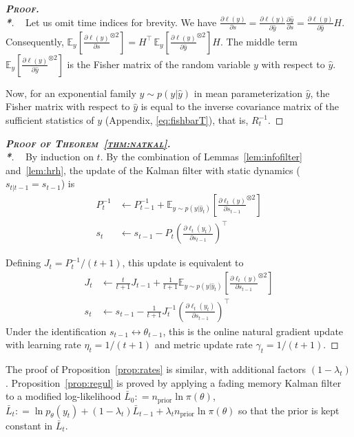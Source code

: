 \documentclass[11pt,a4paper]{article}
\newcommand{\thmheadercommand}[1]{\textbf{\scshape{}#1.\\*}}
\newcommand{\deq}{\mathrel{\mathop{:}}=}
\def\ds{\displaystyle}
\newcommand{\E}{\mathbb{E}}
\newcommand{\1}{\mathbbm{1}}
\newenvironment{dem}[1][]{\begin{proof}[\thmheadercommand{Proof#1}]~\newline\ignorespaces}{\end{proof}}
\theoremstyle{yannthm}
\theoremstyle{yannthm2}
\newcommand{\transp}[1]{#1^{\!\top}\!}
\numberwithin{equation}{section}
\begin{document}
\begin{dem}
Let us omit time indices for brevity. We have $\ds\frac{\partial
\ell(y)}{\partial s}=\frac{\partial \ell(y)}{\partial \hat y}\frac{\partial
\hat y}{\partial s}=\frac{\partial \ell(y)}{\partial \hat y}H$.
Consequently, $\ds \E_y
\left[\frac{\partial \ell(y)}{\partial s}^{\otimes 2}\right]=\transp{H}\,
\E_y
\left[\frac{\partial \ell(y)}{\partial \hat y}^{\otimes 2}\right] H$. 
The middle term $\ds \E_y
\left[\frac{\partial \ell(y)}{\partial \hat y}^{\otimes 2}\right]$ is the
Fisher matrix of the random variable $y$ with respect to $\hat y$.

Now, for
an exponential family $y\sim p(y|\hat y)$ in mean parameterization $\hat y$, the Fisher
matrix with respect to $\hat y$ is equal to the inverse covariance matrix of
the sufficient statistics of $y$ (Appendix, \eqref{eq:fishbarT}), that
is, $R_t^{-1}$.
\end{dem}


\begin{dem}[ of Theorem~\ref{thm:natkal}]
By induction on $t$. By the combination of Lemmas~\ref{lem:infofilter}
and~\ref{lem:hrh}, the update of the Kalman filter with static dynamics
($s_{t|t-1}=s_{t-1}$)
is
\begin{align}
P_t^{-1} &\gets P_{t-1}^{-1}+\E_{y\sim p(y|\hat y_t)}\left[
\frac{
\partial \ell_t(y)}{\partial s_{t-1}}^{\otimes 2}
\right]
\\
s_t &\gets s_{t-1} - P_t \transp{\left(\frac{\partial \ell_t(y_t)}{\partial
s_{t-1}}\right)}
\end{align}

Defining $J_t=P_t^{-1}/(t+1)$, this update is equivalent to
\begin{align*}
J_t &\gets \frac{t}{t+1} J_{t-1}+\frac{1}{t+1} \E_{y\sim p(y|\hat y_t)}\left[
\frac{
\partial \ell_t(y)}{\partial s_{t-1}}^{\otimes 2}
\right]
\\
s_t &\gets s_{t-1} -\frac{1}{t+1} J_t^{-1} \transp{\left(\frac{\partial
\ell_t(y_t)}{\partial
s_{t-1}}\right)}
\end{align*}
Under the identification $s_{t-1}\leftrightarrow \theta_{t-1}$,
this is the online natural gradient update with learning rate $\eta_t=1/(t+1)$
and metric update rate $\gamma_t=1/(t+1)$.
\end{dem}

The proof of Proposition~\ref{prop:rates} is similar, with additional
factors $(1-\lambda_t)$. Proposition~\ref{prop:regul} is proved by
applying a fading memory Kalman filter to a
modified log-likelihood $\bar L_0\deq n_\mathrm{prior}\ln \pi(\theta)$,
$\bar L_t\deq \ln p_\theta(y_t) + (1-\lambda_t)\bar L_{t-1}+\lambda_t
n_\mathrm{prior}
\ln \pi(\theta)$ so that the prior is kept constant in $\bar L_t$.
\end{document}
